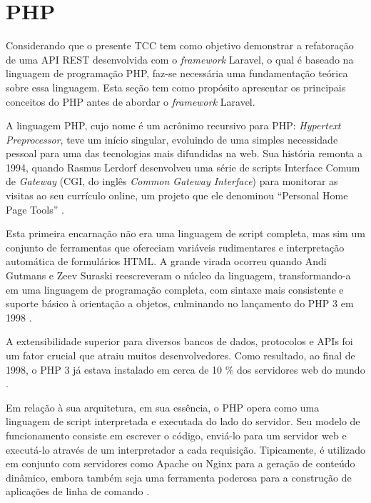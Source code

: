 \section{PHP}
    \par Considerando que o presente TCC tem como objetivo demonstrar a refatoração de uma API REST desenvolvida com o \textit{framework} Laravel, o qual é baseado na linguagem de programação PHP, faz-se necessária uma fundamentação teórica sobre essa linguagem. Esta seção tem como propósito apresentar os principais conceitos do PHP antes de abordar o \textit{framework} Laravel.

    \par A linguagem PHP, cujo nome é um acrônimo recursivo para PHP: \textit{Hypertext Preprocessor}, teve um início singular, evoluindo de uma simples necessidade pessoal para uma das tecnologias mais difundidas na web. Sua história remonta a 1994, quando Rasmus Lerdorf desenvolveu uma série de scripts Interface Comum de \textit{Gateway} (CGI, do inglês \textit{Common Gateway Interface}) para monitorar as visitas ao seu currículo online, um projeto que ele denominou ``Personal Home Page Tools'' \cite{livro:lockhart:2015:php}. 
    
    \par Esta primeira encarnação não era uma linguagem de script completa, mas sim um conjunto de ferramentas que ofereciam variáveis rudimentares e interpretação automática de formulários HTML. A grande virada ocorreu quando Andi Gutmans e Zeev Suraski reescreveram o núcleo da linguagem, transformando-a em uma linguagem de programação completa, com sintaxe mais consistente e suporte básico à orientação a objetos, culminando no lançamento do PHP 3 em 1998 \cite{livro:lockhart:2015:php}.
    
    \par A extensibilidade superior para diversos bancos de dados, protocolos e APIs foi um fator crucial que atraiu muitos desenvolvedores. Como resultado, ao final de 1998, o PHP 3 já estava instalado em cerca de 10 \% dos servidores web do mundo \cite{livro:lockhart:2015:php}.
    
    \par Em relação à sua arquitetura, em sua essência, o PHP opera como uma linguagem de script interpretada e executada do lado do servidor. Seu modelo de funcionamento consiste em escrever o código, enviá-lo para um servidor web e executá-lo através de um interpretador a cada requisição. Tipicamente, é utilizado em conjunto com servidores como Apache ou Nginx para a geração de conteúdo dinâmico, embora também seja uma ferramenta poderosa para a construção de aplicações de linha de comando \cite{livro:lockhart:2015:php}.
    
